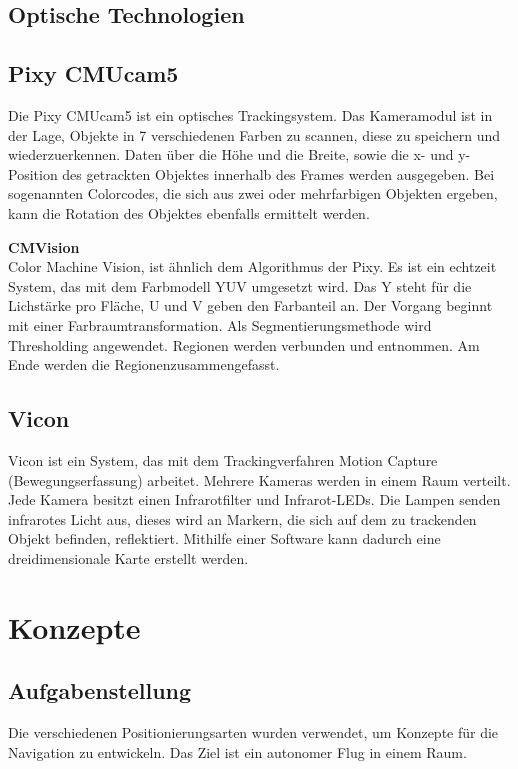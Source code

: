     \subsection{Optische Technologien}
    \subsection*{Pixy CMUcam5}
    Die Pixy CMUcam5 ist ein optisches Trackingsystem. Das Kameramodul ist in der Lage, Objekte in 7 verschiedenen Farben zu scannen, diese zu speichern und wiederzuerkennen. Daten über die Höhe und die Breite, sowie die x- und y-Position des getrackten Objektes innerhalb des Frames werden ausgegeben. Bei sogenannten Colorcodes, die sich aus zwei oder mehrfarbigen Objekten ergeben, kann die Rotation des Objektes ebenfalls ermittelt werden.

    \textbf{CMVision}\\
    Color Machine Vision, ist ähnlich dem Algorithmus der Pixy. Es ist ein echtzeit System, das mit dem Farbmodell YUV umgesetzt wird. Das Y steht für die Lichstärke pro Fläche, U und V geben den Farbanteil an. Der Vorgang beginnt mit einer Farbraumtransformation. Als Segmentierungsmethode wird Thresholding angewendet. Regionen werden verbunden und entnommen. Am Ende werden die Regionenzusammengefasst. \cite{Pixy} \cite{Pixy_Verfahren} \cite{Pixy_Verfahren2}

    \subsection*{Vicon}
    Vicon ist ein System, das mit dem Trackingverfahren Motion Capture (Bewegungserfassung) arbeitet.
    Mehrere Kameras werden in einem Raum verteilt. Jede Kamera besitzt einen Infrarotfilter und Infrarot-LEDs. Die Lampen senden infrarotes Licht aus, dieses wird an Markern, die sich auf dem zu trackenden Objekt befinden, reflektiert. Mithilfe einer Software kann dadurch eine dreidimensionale Karte erstellt werden.
    \cite{Vicon}

  \section{Konzepte}

    \subsection{Aufgabenstellung}
    Die verschiedenen Positionierungsarten wurden verwendet, um Konzepte für die Navigation zu entwickeln. Das Ziel ist ein autonomer Flug in einem Raum.

